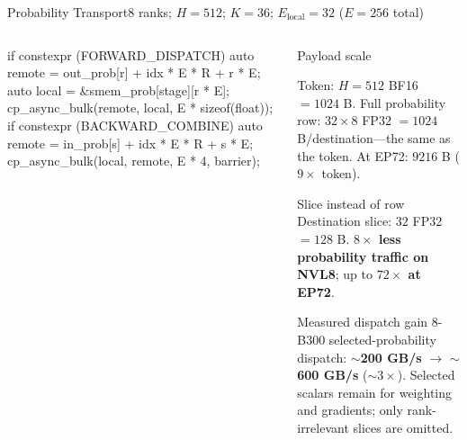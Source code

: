 \documentclass[aspectratio=169,10pt]{beamer}
\renewcommand{\NvidiaSource}[1]{}
\newcommand{\LocalSource}[1]{\NvidiaSource{\texttt{#1}}}
\begin{document}
\begin{frame}[fragile]{Probability Transport}{8 ranks; $H=512$; $K=36$; $E_{\mathrm{local}}=32$ ($E=256$ total)}
  \LocalSource{notes/final_presentation/sparser\_moe\_final\_presentation\_content.md}
  \begin{columns}[T,onlytextwidth]
    \begin{column}{.45\textwidth}
      \begin{NvidiaCode}[language=C++,basicstyle=\ttfamily\fontsize{5.6}{6.5}\selectfont]
if constexpr (FORWARD_DISPATCH) {
  auto remote = out_prob[r] + idx * E * R + r * E;
  auto local  = &smem_prob[stage][r * E];
  cp_async_bulk(remote, local, E * sizeof(float));
}
if constexpr (BACKWARD_COMBINE) {
  auto remote = in_prob[s] + idx * E * R + s * E;
  cp_async_bulk(local, remote, E * 4, barrier);
}
      \end{NvidiaCode}
    \end{column}
    \begin{column}{.50\textwidth}
      {\NvidiaSansMedium Payload scale}\NvidiaTightRule{.6pt}\vspace{.04in}
      \fontsize{8.1}{9.6}\selectfont\raggedright
      Token: $H=512$ BF16 $=1024$ B. Full probability row: $32\mathbin{\times}8$ FP32
      $=1024$ B/destination---the same as the token. At EP72: $9216$ B ($9\times$ token).\par\vspace{.045in}
      {\NvidiaSansMedium Slice instead of row}\NvidiaTightRule{.6pt}\vspace{.04in}
      Destination slice: $32$ FP32 $=128$ B. \textbf{$8\times$ less probability traffic on
      NVL8}; up to \textbf{$72\times$ at EP72}.\par\vspace{.045in}
      {\NvidiaSansMedium Measured dispatch gain}\NvidiaTightRule{.6pt}\vspace{.04in}
      8-B300 selected-probability dispatch: \textbf{$\sim$200 GB/s} $\rightarrow$
      \textbf{$\sim$600 GB/s} (\textbf{$\sim3\times$}). Selected scalars remain for
      weighting and gradients; only rank-irrelevant slices are omitted.
    \end{column}
  \end{columns}
\end{frame}
\end{document}
